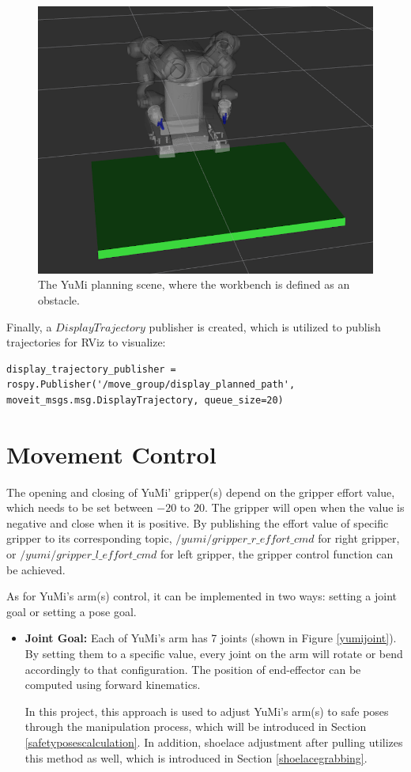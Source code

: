 \begin{figure}[H]
\centering
\includegraphics[width = 0.5\columnwidth]{Implementation/mp/planningscene.png}
\caption{The YuMi planning scene, where the workbench is defined as an obstacle.}
\label{scene}
\end{figure}

Finally, a $DisplayTrajectory$ publisher is created, which is utilized to publish trajectories for RViz to visualize:

\begin{verbatim}
display_trajectory_publisher = rospy.Publisher('/move_group/display_planned_path', 	moveit_msgs.msg.DisplayTrajectory, queue_size=20)
\end{verbatim}


\section{Movement Control} \label{movementcontrol}
The opening and closing of YuMi' gripper(s) depend on the gripper effort value, which needs to be set between $-20$ to $20$. The gripper will open when the value is negative and close when it is positive. By publishing the effort value of specific gripper to its corresponding topic, $/yumi/gripper\_r\_effort\_cmd$ for right gripper, or $/yumi/gripper\_l\_effort\_cmd$ for left gripper, the gripper control function can be achieved. 


As for YuMi's arm(s) control, it can be implemented in two ways: setting a joint goal or setting a pose goal.

\begin{itemize}
    \item \textbf{Joint Goal:} Each of YuMi's arm has 7 joints (shown in Figure \ref{yumijoint}). By setting them to a specific value, every joint on the arm will rotate or bend accordingly to that configuration. The position of end-effector can be computed using forward kinematics.
    
    In this project, this approach is used to adjust YuMi's arm(s) to safe poses through the manipulation process, which will be introduced in Section \ref{safetyposescalculation}. In addition, shoelace adjustment after pulling utilizes this method as well, which is introduced in Section \ref{shoelacegrabbing}.
\end{itemize}

